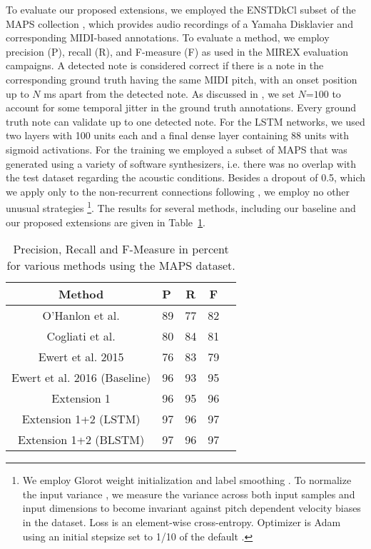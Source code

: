 \documentclass{article}
\begin{document}
To evaluate our proposed extensions, we employed the ENSTDkCl subset of the MAPS collection \cite{EmiyaBD10_MultipitchEstimation_TASLP}, which provides audio recordings of a Yamaha Disklavier and corresponding MIDI-based annotations. 
To evaluate a method, we employ precision (P), recall (R), and F-measure (F) as used in the MIREX evaluation campaigns.
A detected note is considered correct if there is a note in the corresponding ground truth having the same MIDI pitch, with an onset position up to $N$ ms apart from the detected note.
As discussed in \cite{EwertS16_PianoTranscriptionADMM_TASLP}, we set $N$=$100$ to account for some temporal jitter in the ground truth annotations.
Every ground truth note can validate up to one detected note.
For the LSTM networks, we used two layers with 100 units each and a final dense layer containing 88 units with sigmoid activations. For the training we employed a subset of MAPS that was generated using a variety of software synthesizers, i.e. there was no overlap with the test dataset regarding the acoustic conditions. Besides a dropout of 0.5, which we apply only to the non-recurrent connections following \cite{ZarembaSV2014_RNNRegularization_ARXIV}, we employ no other unusual strategies \cite{Bengio2012_PracticalRecommendationsTraining_TOTT}\footnote{We employ Glorot weight initialization \cite{GlorotB2010_UnderstandingDifficultyTraining_AISTATS} and label smoothing \cite{Bengio2012_PracticalRecommendationsTraining_TOTT}.
To normalize the input variance \cite{Bengio2012_PracticalRecommendationsTraining_TOTT}, we measure the variance across both input samples and input dimensions to become invariant against pitch dependent velocity biases in the dataset. Loss is an element-wise cross-entropy. Optimizer is Adam using an initial stepsize set to 1/10 of the default \cite{KingmaB2014_Adam_ARXIV}.}. The results for several methods, including our baseline \cite{EwertS16_PianoTranscriptionADMM_TASLP} and our proposed extensions are given in Table~\ref{tab:dataset_MAPS}.

\begin{table}[t]
\centering
\footnotesize
\begin{tabular}{clccc}
\textbf{Method} & \textbf{P} & \textbf{R} & \textbf{F}\\
\hline
O'Hanlon et al. \cite{OHanlonNKP2016_NonNegativeGroupSparseTranscription_TASLP} & 89 & 77 & 82 \\
Cogliati et al. \cite{CogliatiDW2017_PianoTransConvolutional_IEEESPL} & 80 & 84 & 81 \\
Ewert et al. 2015 \cite{EwertPS15_DPNMD_ICASSP} & 76 & 83 & 79 \\ %
Ewert et al. 2016 (Baseline) \cite{EwertS16_PianoTranscriptionADMM_TASLP} & 96 & 93 & 95 \\ %
Extension 1 & 96 & 95 & 96 \\ %
Extension 1+2 (LSTM) & 97 & 96 & 97 \\ %
Extension 1+2 (BLSTM) & 97 & 96 & 97
\end{tabular}
\caption{Precision, Recall and F-Measure in percent for various methods using the MAPS dataset.}
\label{tab:dataset_MAPS}
\end{table}
\end{document}
